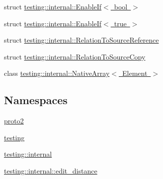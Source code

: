 \begin{DoxyCompactItemize}
\item 
struct \mbox{\hyperlink{structtesting_1_1internal_1_1_enable_if}{testing\+::internal\+::\+Enable\+If$<$ bool $>$}}
\item 
struct \mbox{\hyperlink{structtesting_1_1internal_1_1_enable_if_3_01true_01_4}{testing\+::internal\+::\+Enable\+If$<$ true $>$}}
\item 
struct \mbox{\hyperlink{structtesting_1_1internal_1_1_relation_to_source_reference}{testing\+::internal\+::\+Relation\+To\+Source\+Reference}}
\item 
struct \mbox{\hyperlink{structtesting_1_1internal_1_1_relation_to_source_copy}{testing\+::internal\+::\+Relation\+To\+Source\+Copy}}
\item 
class \mbox{\hyperlink{classtesting_1_1internal_1_1_native_array}{testing\+::internal\+::\+Native\+Array$<$ Element $>$}}
\end{DoxyCompactItemize}
\subsection*{Namespaces}
\begin{DoxyCompactItemize}
\item 
 \mbox{\hyperlink{namespaceproto2}{proto2}}
\item 
 \mbox{\hyperlink{namespacetesting}{testing}}
\item 
 \mbox{\hyperlink{namespacetesting_1_1internal}{testing\+::internal}}
\item 
 \mbox{\hyperlink{namespacetesting_1_1internal_1_1edit__distance}{testing\+::internal\+::edit\+\_\+distance}}
\end{DoxyCompactItemize}
